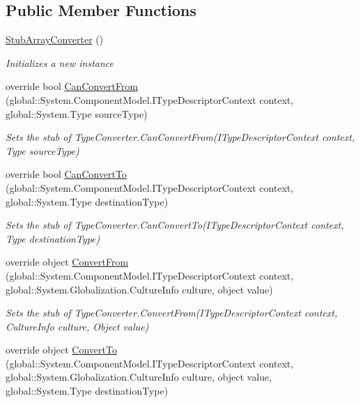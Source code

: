 \subsection*{Public Member Functions}
\begin{DoxyCompactItemize}
\item 
\hyperlink{class_system_1_1_component_model_1_1_fakes_1_1_stub_array_converter_a30d2122ca26e9cce77e32d17d747e183}{Stub\-Array\-Converter} ()
\begin{DoxyCompactList}\small\item\em Initializes a new instance\end{DoxyCompactList}\item 
override bool \hyperlink{class_system_1_1_component_model_1_1_fakes_1_1_stub_array_converter_a8c2c3b1ec8501fabcae5ec5b12b39ddc}{Can\-Convert\-From} (global\-::\-System.\-Component\-Model.\-I\-Type\-Descriptor\-Context context, global\-::\-System.\-Type source\-Type)
\begin{DoxyCompactList}\small\item\em Sets the stub of Type\-Converter.\-Can\-Convert\-From(\-I\-Type\-Descriptor\-Context context, Type source\-Type)\end{DoxyCompactList}\item 
override bool \hyperlink{class_system_1_1_component_model_1_1_fakes_1_1_stub_array_converter_af904a986cd747b8a80dc79ce34d5e124}{Can\-Convert\-To} (global\-::\-System.\-Component\-Model.\-I\-Type\-Descriptor\-Context context, global\-::\-System.\-Type destination\-Type)
\begin{DoxyCompactList}\small\item\em Sets the stub of Type\-Converter.\-Can\-Convert\-To(\-I\-Type\-Descriptor\-Context context, Type destination\-Type)\end{DoxyCompactList}\item 
override object \hyperlink{class_system_1_1_component_model_1_1_fakes_1_1_stub_array_converter_a506767b88f78c702ccc9fb70f0ccfdc0}{Convert\-From} (global\-::\-System.\-Component\-Model.\-I\-Type\-Descriptor\-Context context, global\-::\-System.\-Globalization.\-Culture\-Info culture, object value)
\begin{DoxyCompactList}\small\item\em Sets the stub of Type\-Converter.\-Convert\-From(\-I\-Type\-Descriptor\-Context context, Culture\-Info culture, Object value)\end{DoxyCompactList}\item 
override object \hyperlink{class_system_1_1_component_model_1_1_fakes_1_1_stub_array_converter_af655cf52c570c43815129a0e7c3f80a5}{Convert\-To} (global\-::\-System.\-Component\-Model.\-I\-Type\-Descriptor\-Context context, global\-::\-System.\-Globalization.\-Culture\-Info culture, object value, global\-::\-System.\-Type destination\-Type)

\end{DoxyCompactItemize}

